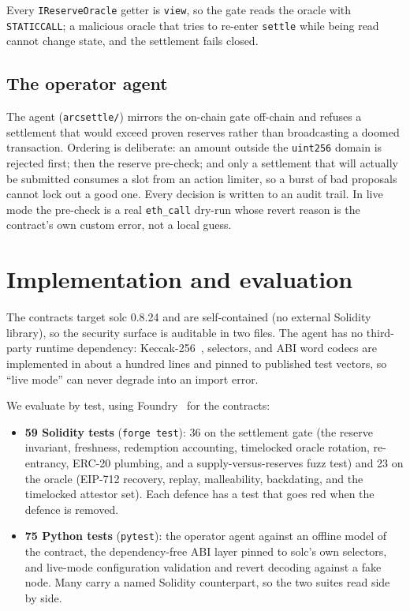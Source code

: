 \documentclass[11pt]{article}
\begin{document}
Every \texttt{IReserveOracle} getter is \texttt{view}, so the gate reads the oracle with
\texttt{STATICCALL}; a malicious oracle that tries to re-enter \texttt{settle} while being
read cannot change state, and the settlement fails closed.

\subsection{The operator agent}
The agent (\texttt{arcsettle/}) mirrors the on-chain gate off-chain and refuses a
settlement that would exceed proven reserves rather than broadcasting a doomed
transaction. Ordering is deliberate: an amount outside the \texttt{uint256} domain is
rejected first; then the reserve pre-check; and only a settlement that will actually be
submitted consumes a slot from an action limiter, so a burst of bad proposals cannot lock
out a good one. Every decision is written to an audit trail. In live mode the pre-check is
a real \texttt{eth\_call} dry-run whose revert reason is the contract's own custom error,
not a local guess.

\section{Implementation and evaluation}
The contracts target solc 0.8.24 and are self-contained (no external Solidity library),
so the security surface is auditable in two files. The agent has no third-party runtime
dependency: Keccak-256~\cite{keccak}, selectors, and ABI word codecs are implemented in
about a hundred lines and pinned to published test vectors, so ``live mode'' can never
degrade into an import error.

We evaluate by test, using Foundry~\cite{foundry} for the contracts:

\begin{itemize}[leftmargin=1.4em]
\item \textbf{59 Solidity tests} (\texttt{forge test}): 36 on the settlement gate (the
reserve invariant, freshness, redemption accounting, timelocked oracle rotation,
re-entrancy, ERC-20 plumbing, and a supply-versus-reserves fuzz test) and 23 on the
oracle (EIP-712 recovery, replay, malleability, backdating, and the timelocked attestor
set). Each defence has a test that goes red when the defence is removed.
\item \textbf{75 Python tests} (\texttt{pytest}): the operator agent against an offline
model of the contract, the dependency-free ABI layer pinned to solc's own selectors, and
live-mode configuration validation and revert decoding against a fake node. Many carry a
named Solidity counterpart, so the two suites read side by side.
\end{itemize}
\end{document}
